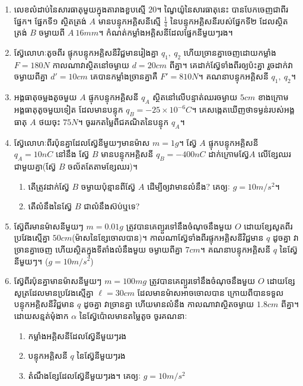 \begin{enumerate}[m]
\begin{enumerate}[k]
		\end{enumerate}
		\item លេខលំដាប់នៃសារធាតុមួយក្នុងតារាងខួបស្មើ $20$។ ណ្វៃយ៉ូនៃសារធាតុនេះ បានបែកចេញជាពីរផ្នែក។ ផ្នែកទី១ ស្ថិតត្រង់ $A$ មានបន្ទុកអគ្គិសនីស្មើ $\frac{1}{4}$ នៃបន្ទុកអគ្គិសនីរបស់ផ្នែកទី២ ដែលស្ថិតត្រង់ $B$ ចម្ងាយពី $A~16mm$។ កំណត់កម្លាំងអគ្គិសនីដែលផ្នែកនីមួយៗរង។
		\item ស៊្វែលោហៈតូចពីរ ផ្ទុកបន្ទុកអគ្គិសនីវិជ្ជមានរៀងគ្នា $q_{1},~q_{2}$ ហើយច្រានគ្នាចេញដោយកម្លាំង $F=180N$ កាលណាវាស្ថិតនៅចម្ងាយ $d=20cm$ ពីគ្នា។ គេដាក់ស៊្វែទាំងពីរឲ្យប៉ះគ្នា រួចដាក់វាចម្ងាយពីគ្នា $d'=10cm$ គេបានកម្លាំងច្រានគ្នាគឺ $F'=810N$។ គណនាបន្ទុកអគ្គិសនី $q_{1},~q_{2}$។
		\item អង្គធាតុចម្លងតូចមួយ $A$ ផ្ទុកបន្ទុកអគ្គិសនី $q_{A}$ ស្ថិតនៅលើបន្ទាត់ឈរចម្ងាយ $5cm$ ខាងក្រោមអង្គធាតុតូចមួយទៀត ដែលមានបន្ទុក $q_{B}=-25\times10^{-6}C$។ គេសង្កេតឃើញថាទម្ងន់របស់អង្គធាតុ $A$ ថយចុះ $75N$។ ចូររកតម្លៃពីជគណិតនៃបន្ទុក $q_{A}$។
		\item ស៊្វែលោហៈពីរប៉ុនគ្នាដែលស៊្វែនីមួយៗមានម៉ាស $m=1g$។ ស៊្វែ $A$ ផ្ទុកបន្ទុកអគ្គិសនី $q_{A}=10nC$ នៅនឹង ស៊្វែ $B$ មានបន្ទុកអគ្គិសនី $q_{B}=-400nC$ ដាក់ក្រោមស៊្វែ​ $A$ លើខ្សែឈរជាមួយគ្នា(ស៊្វែ $B$ ចល័តតែតាមខ្សែឈរ)។
		\begin{enumerate}[k]
			\item តើត្រូវដាក់ស៊្វែ $B$ ចម្ងាយប៉ុន្មានពីស៊្វែ $A$ ដើម្បីឲ្យវាមានលំនឹង? គេឲ្យៈ $g=10m/s^{2}$។
			\item តើលំនឹងនៃស៊្វែ $B$ ជាលំនឹងស៊ប់ឬទេ?
		\end{enumerate}
		\item ស៊្វែពីរមានម៉ាសនីមួយៗ $m=0.01g$ ត្រូវបានគេព្យួរទៅនឹងចំណុចនឹងមួយ $O$ ដោយខ្សែសូតពីរប្រវែងស្មើគ្នា $50cm$(ម៉ាសនៃខ្សែចោលបាន)។ កាលណាស៊្វែទាំងពីរផ្ទុកអគ្គិសនីវិជ្ជមាន $q$ ដូចគ្នា វាច្រានគ្នាចេញ ហើយស្ថិតក្នុងទីតាំងលំនឹងមួយ ចម្ងាយពីគ្នា $7cm$។ គណនាបន្ទុកអគ្គិសនី $q$ នៃស៊្វែនីមួយៗ។ ($g=10m/s^{2}$)
		\item ស៊្វែពីរប៉ុនគ្នាមានម៉ាសនីមួយៗ $m=100mg$ ត្រូវបានគេព្យួរទៅនឹងចំណុចនឹងមួយ $O$ ដោយខ្សែសូត្រដែលមានប្រវែងស្មើគ្នា $\ell=30cm$ ដែលមានម៉ាសអាចចោលបាន ក្រោយពីបានទទួលបន្ទុកអគ្គិសនីវិជ្ជមាន $q$ ដូចគ្នា វាច្រានគ្នា ហើយមានលំនឹង កាលណាវាស្ថិតចម្ងាយ $1.8cm$ ពីគ្នា។ ដោយសន្មត់មុំងាក $\alpha$ នៃស៊្វែប៉ោលមានតម្លៃតូច ចូរគណនាៈ
		\begin{enumerate}[k]
			\item កម្លាំងអគ្គិសនីដែលស៊្វែនីមួយៗរង
			\item បន្ទុកអគ្គិសនី $q$ នៃស៊្វែនីមួយៗរង
			\item តំណឹងខ្សែដែលស៊្វែនីមួយៗរង។ គេឲ្យៈ $g=10m/s^{2}$
		\end{enumerate}

\end{enumerate}

